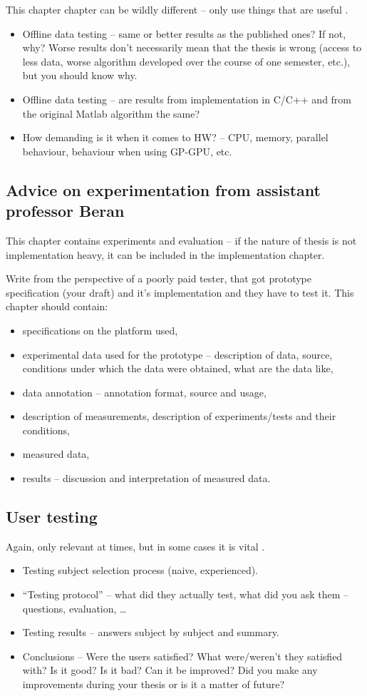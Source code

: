 This chapter chapter can be wildly different -- only use things that are useful \cite{Cernocky}.
\begin{itemize}
  \item{Offline data testing -- same or better results as the published ones? If not, why? Worse results don't necessarily mean that the thesis is wrong (access to less data, worse algorithm developed over the course of one semester, etc.), but you should know why.}
  \item{Offline data testing -- are results from implementation in C/C++ and from the original Matlab algorithm the same?}
  \item{How demanding is it when it comes to HW? -- CPU, memory, parallel behaviour, behaviour when using GP-GPU, etc.}
\end{itemize}

\subsection*{Advice on experimentation from assistant professor Beran}
This chapter contains experiments and evaluation -- if the nature of thesis is not implementation heavy, it can be included in the implementation chapter.

Write from the perspective of a poorly paid tester, that got prototype specification (your draft) and it's implementation and they have to test it. This chapter should contain:
\begin{itemize}
  \item{specifications on the platform used,}
  \item{experimental data used for the prototype -- description of data, source, conditions under which the data were obtained, what are the data like,}
  \item{data annotation -- annotation format, source and usage,}
  \item{description of measurements, description of experiments/tests and their conditions,}
  \item{measured data,}
  \item{results -- discussion and interpretation of measured data.}
\end{itemize}

\subsection*{User testing}

Again, only relevant at times, but in some cases it is vital \cite{Cernocky}.
\begin{itemize}
  \item{Testing subject selection process (naive, experienced).}
  \item{``Testing protocol'' -- what did they actually test, what did you ask them -- questions, evaluation, \ldots}
  \item{Testing results -- answers subject by subject and summary.}
  \item{Conclusions -- Were the users satisfied? What were/weren't they satisfied with? Is it good? Is it bad? Can it be improved? Did you make any improvements during your thesis or is it a matter of future?}
\end{itemize}


